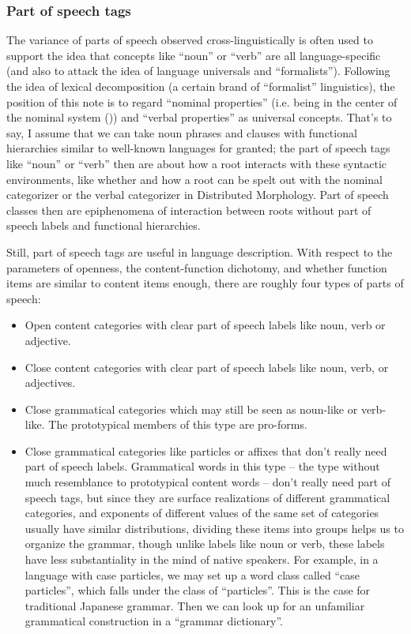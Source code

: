 \documentclass[UTF8, a4paper, oneside, scheme=plain, 12pt]{ctexbook}
\begin{document}
{\subsubsection{Part of speech tags}\label{sec:theory.pos}

The variance of parts of speech observed cross-linguistically
is often used to support the idea that 
concepts like ``noun'' or ``verb'' 
are all language-specific
(and also to attack the idea of language universals and ``formalists'').
Following the idea of lexical decomposition (a certain brand of ``formalist'' linguistics),
the position of this note is to regard ``nominal properties''
(i.e. being in the center of the nominal system ())
and ``verbal properties''
as universal concepts.
That's to say, I assume that we can take noun phrases and clauses
with functional hierarchies similar to well-known languages 
for granted;
the part of speech tags like ``noun'' or ``verb''
then are about how a root interacts with these syntactic environments,
like whether and how a root can be spelt out 
with the nominal categorizer or the verbal categorizer in Distributed Morphology. 
Part of speech classes then are epiphenomena 
of interaction between roots without part of speech labels  
and functional hierarchies.

Still, part of speech tags are useful in language description.
With respect to the parameters of 
openness, the content-function dichotomy,
and whether function items are similar to content items enough,
there are roughly four types of parts of speech:
\begin{itemize}
    \item Open content categories with clear part of speech labels like noun, verb or adjective.
    \item Close content categories with clear part of speech labels like noun, verb, or adjectives.
    \item Close grammatical categories which may still be seen as noun-like or verb-like. 
    The prototypical members of this type are pro-forms.
    \item Close grammatical categories like particles or affixes that don't really need part of speech labels.
    Grammatical words in this type -- the type without much resemblance to prototypical content words -- 
    don't really need part of speech tags,
    but since they are surface realizations of different grammatical categories,
    and exponents of different values of the same set of categories 
    usually have similar distributions,
    dividing these items into groups helps us to organize the grammar,
    though unlike labels like noun or verb,
    these labels have less substantiality in the mind of native speakers.
    For example, in a language with case particles,
    we may set up a word class called ``case particles'',
    which falls under the class of ``particles''.
    This is the case for traditional Japanese grammar.
    Then we can look up for an unfamiliar grammatical construction 
    in a ``grammar dictionary''.
\end{itemize}

}
\end{document}
